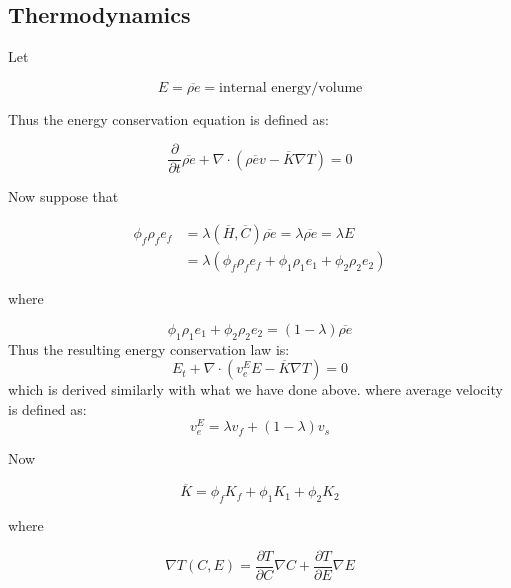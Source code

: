 \newpage

\subsection{Thermodynamics}

\indent \indent Let

\begin{equation}
		  E = \overline{\rho e} = \text{internal energy/volume}
\end{equation}

Thus the energy conservation equation is defined as:

\begin{equation}
		  \frac{\partial}{\partial t} \overline{\rho e} + \nabla \cdot (\overline{\rho e v} - \overline{K} \nabla T) = 0
\end{equation}

Now suppose that 

\begin{equation}
		  \begin{aligned}
					 \phi_{f}\rho_{f}e_{f} &= \lambda(\overline{H},\overline{C})\overline{\rho e} = \lambda \overline{\rho e} = \lambda E\\
					 &= \lambda (\phi_f \rho_f e_f + \phi_1 \rho_1 e_1 + \phi_2 \rho_2 e_2)
		  \end{aligned}
\end{equation}

where

\begin{equation}
		  \phi_1 \rho_1 e_1 + \phi_2 \rho_2 e_2 = (1-\lambda)\overline{\rho e}
\end{equation} Thus the resulting energy conservation law is: \begin{equation} E_t + \nabla \cdot (v_e^E E - \overline{K}\nabla T) = 0 \end{equation} which is derived similarly with what we have done above.  where average velocity is defined as: \begin{equation} v_e^E = \lambda v_f + (1-\lambda) v_s \end{equation}

Now

\begin{equation}
\overline{K} = \phi_f K_f + \phi_1 K_1 + \phi_2 K_2
\end{equation}

where

\begin{equation}
		  \nabla T(C,E) = \frac{\partial T}{\partial C}\nabla C + \frac{\partial T}{\partial E}\nabla E
\end{equation}

